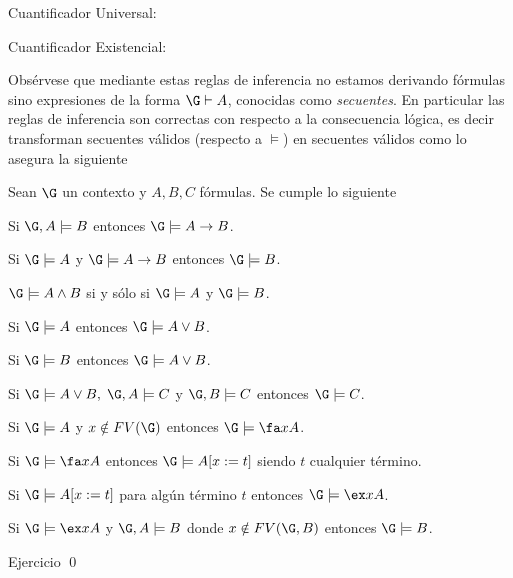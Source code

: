 \documentclass[11pt,letterpaper]{article}
\begin{document}
\item Cuantificador Universal:
\begin{mathpar}

\end{mathpar}

\item Cuantificador Existencial:
\begin{mathpar}

\end{mathpar}

\ei

Obsérvese que mediante estas reglas de inferencia no estamos derivando
fórmulas sino expresiones de la forma $\G\vdash A$, conocidas como {\em 
secuentes}.
En particular las reglas de inferencia son correctas con respecto a la 
consecuencia lógica, es decir transforman secuentes válidos
(respecto a $\models$) en secuentes válidos como lo asegura la siguiente

\begin{proposition}\label{prop:rdnsem}
Sean $\G$ un contexto y $A,B,C$ fórmulas. 
Se cumple lo siguiente
\bi
\item Si $\G,A\models B$ entonces $\G\models A\to B$.
\item Si $\G\models A$ y $\G\models A\to B$ entonces $\G\models B$.
\item $\G\models A\land B$ si y sólo si $\G\models A$ y $\G\models B$.
\item Si $\G\models A$ entonces $\G\models A\lor B$.
\item Si $\G\models B$ entonces $\G\models A\lor B$.
\item Si $\G\models A\lor B,\;\G,A\models C$ y $\G,B\models C$ entonces 
$\G\models C$.
\item Si $\G\models A$ y $x\notin FV(\G)$ entonces $\G\models \fa xA$.
\item Si $\G\models \fa xA$ entonces $\G\models A[x:=t]$ siendo $t$ cualquier 
término.
\item Si $\G\models A[x:=t]$ para algún término $t$ entonces $\G\models\ex xA$.
\item Si $\G\models\ex x A$ y $\G,A\models B$ donde $x\notin FV(\G,B)$ entonces 
$\G\models B$.
\ei
\end{proposition}
\proof Ejercicio \qed
\end{document}

